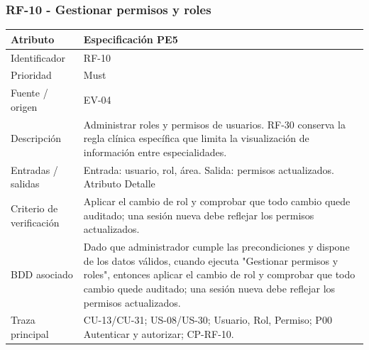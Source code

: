 \documentclass[11pt,a4paper]{article}
\begin{document}
	\subsubsection{RF-10 - Gestionar permisos y roles}
	\begin{tabularx}{\textwidth}{p{3.2cm}Y}
		\toprule
		\textbf{Atributo} & \textbf{Especificación PE5}\\\midrule
		Identificador & RF-10\\
		Prioridad & Must\\
		Fuente / origen & EV-04\\
		Descripción & Administrar roles y permisos de usuarios. RF-30 conserva la regla clínica específica que limita la visualización de información entre especialidades.\\
		Entradas / salidas & Entrada: usuario, rol, área. Salida: permisos actualizados. Atributo Detalle\\
		Criterio de verificación & Aplicar el cambio de rol y comprobar que todo cambio quede auditado; una sesión nueva debe reflejar los permisos actualizados.\\
		BDD asociado & Dado que administrador cumple las precondiciones y dispone de los datos válidos, cuando ejecuta "Gestionar permisos y roles", entonces aplicar el cambio de rol y comprobar que todo cambio quede auditado; una sesión nueva debe reflejar los permisos actualizados.\\
		Traza principal & CU-13/CU-31; US-08/US-30; Usuario, Rol, Permiso; P00 Autenticar y autorizar; CP-RF-10.\\
		\bottomrule
	\end{tabularx}
	\clearpage
\end{document}
